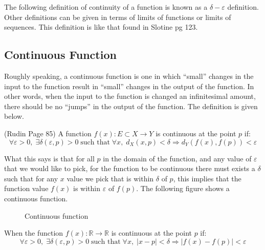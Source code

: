 The following definition of continuity of a function is known as a $\delta-\varepsilon$ definition.
Other definitions can be given in terms of limits of functions or limits of sequences.
This definition is like that found in Slotine pg 123.

\subsection{Continuous Function}

Roughly speaking, a continuous function is one in which ``small'' changes in the input to the function result in ``small'' changes in the output of the function.
In other words, when the input to the function is changed an infinitesimal amount, there should be no ``jumps'' in the output of the function.
The definition is given below.

\begin{defn-dan}
  (Rudin Page 85) A function $f(x):E\subset X\rightarrow Y$ is continuous at the point $p$ if:
  \begin{equation*}
    \forall\varepsilon>0,\;\exists\delta(\varepsilon,p)>0\;\text{such that}\;\forall x,\;d_{X}(x,p)<\delta\Rightarrow d_{Y}(f(x),f(p))<\varepsilon
  \end{equation*}
\end{defn-dan}
What this says is that for all $p$ in the domain of the function, and any value of $\varepsilon$ that we would like to pick, for the function to be continuous there must exists a $\delta$ such that for any $x$ value we pick that is within $\delta$ of $p$, this implies that the function value $f(x)$ is within $\varepsilon$ of $f(p)$.
The following figure shows a continuous function.

\begin{figure}[H]
  \begin{center}
    \caption{Continuous function\label{real.label_fig_4}}
  \end{center}
\end{figure}

When the function $f(x):\mathbb{R}\rightarrow\mathbb{R}$ is continuous at the point $p$ if:
\begin{equation*}
  \forall\varepsilon>0,\;\exists\delta(\varepsilon,p)>0\;\text{such that}\;\forall x,\;|x-p|<\delta\Rightarrow|f(x)-f(p)|<\varepsilon
\end{equation*}

